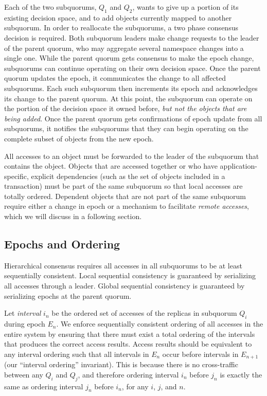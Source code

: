\documentclass[sigconf]{acmart}
\begin{document}
Each of the two subquorums, $Q_1$ and $Q_2$, wants to give up a portion of its
existing decision space, and to add objects currently mapped to another subquorum.
In order to reallocate the subquorums, a two phase consensus decision is required.
Both subquorum leaders make change requests to the leader of the parent quorum, who may
aggregate several namespace changes into a single one.
While the parent quorum gets consensus to make the epoch change, subquorums can continue
operating on their own decision space.
Once the parent quorum updates the epoch, it communicates the change to all affected
subquorums.
Each such subquorum then increments its epoch and acknowledges its change to the parent
quorum.
At this point, the subquorum can operate on the portion of the decision space it owned
before, \emph{but not the objects that are being added}.
Once the parent quorum gets confirmations of epoch update from all subquorums, it notifies
the subquorums that they can begin operating on the complete subset of objects from the
new epoch.

All accesses to an object must be forwarded to the leader of the subquorum that contains
the object.
Objects that are accessed together or who have application-specific, explicit
dependencies (such as the set of objects included in a transaction) must be part of the
same subquorum so that local accesses are totally ordered.
Dependent objects that are not part of the same subquorum require either a change in
epoch or a mechanism to facilitate \textit{remote accesses}, which we will discuss in a
following section.

\subsection{Epochs and Ordering}

Hierarchical consensus requires all accesses in all subquorums to be at least
sequentially consistent.
Local sequential consistency is guaranteed by serializing all accesses through a leader.
Global sequential consistency is guaranteed by serializing epochs at the parent quorum.

Let \emph{interval} $i_n$ be the ordered set of accesses of the replicas in subquorum
$Q_i$ during epoch $E_n$.
We enforce sequentially consistent ordering of all accesses in the entire system by
ensuring that there must exist a total ordering of the intervals that produces the correct
access results.
Access results should be equivalent to any interval ordering
such that all intervals in $E_n$ occur before intervals in $E_{n+1}$ (our ``interval
ordering'' invariant).
This is because there is no cross-traffic between any $Q_i$ and $Q_j$, and therefore
ordering interval $i_n$ before $j_n$ is exactly the same as ordering interval $j_n$
before $i_n$, for any $i$, $j$, and $n$.
\end{document}
